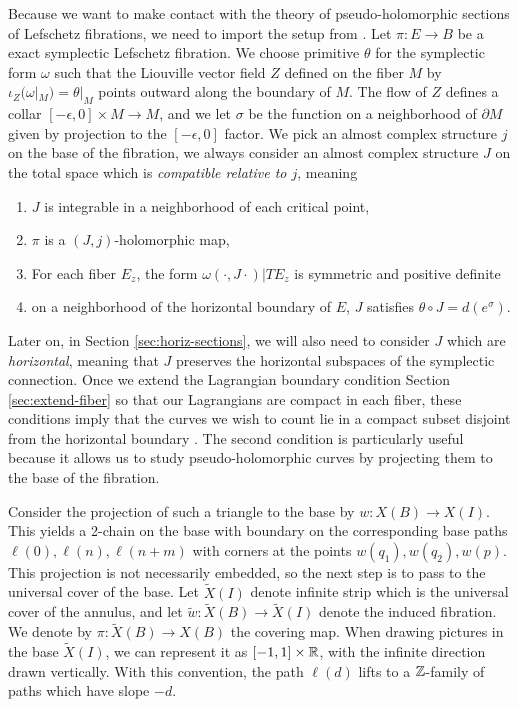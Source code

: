 \documentclass[12pt]{amsart}
\begin{document}
Because we want to make contact with the theory of pseudo-holomorphic sections of Lefschetz fibrations, we need to import the setup from \cite[\S 2.1]{seidel-les}. Let $\pi : E \to B$ be a exact symplectic Lefschetz fibration. We choose primitive $\theta$ for the symplectic form $\omega$ such that the Liouville vector field $Z$ defined on the fiber $M$ by $\iota_Z(\omega|_M) = \theta|_M$ points outward along the boundary of $M$. The flow of $Z$ defines a collar $[-\epsilon,0]\times M \to M$, and we let $\sigma$ be the function on a neighborhood of $\partial M$ given by projection to the $[-\epsilon,0]$ factor. We pick an almost complex structure $j$ on the base of the fibration, we always consider an almost complex structure $J$ on the total space which is \emph{compatible relative to $j$}, meaning
\begin{enumerate}
\item $J$ is integrable in a neighborhood of each critical point,
\item $\pi$ is a $(J,j)$-holomorphic map,
\item For each fiber $E_z$, the form $\omega(\cdot, J\cdot)|TE_z$ is symmetric and positive definite
\item on a neighborhood of the horizontal boundary of $E$, $J$ satisfies $\theta \circ J = d(e^\sigma)$.
\end{enumerate}
Later on, in Section \ref{sec:horiz-sections}, we will also need to consider $J$ which are \emph{horizontal}, meaning that $J$ preserves the horizontal subspaces of the symplectic connection. Once we extend the Lagrangian boundary condition Section \ref{sec:extend-fiber} so that our Lagrangians are compact in each fiber, these conditions imply that the curves we wish to count lie in a compact subset disjoint from the horizontal boundary \cite[Lemma 2.2]{seidel-les}. The second condition is particularly useful because it allows us to study pseudo-holomorphic curves by projecting them to the base of the fibration.

Consider the projection of such a triangle to the base by $w : X(B)\to
X(I)$. This yields a 2-chain on the base with boundary on the
corresponding base paths $\ell(0),\ell(n),\ell(n+m)$ with corners at
the points $w(q_1),w(q_2),w(p)$. This projection is not necessarily embedded, so the next step is to pass to the universal cover of the
base. Let $\tilde{X}(I)$ denote infinite strip which is the universal
cover of the annulus, and let $\tilde{w}: \tilde{X}(B) \to
\tilde{X}(I)$ denote the induced fibration. We denote by $\pi:
\tilde{X}(B) \to X(B)$ the covering map. When drawing pictures in the
base $\tilde{X}(I)$, we can represent it as $[-1,1] \times \mathbb{R}$, with
the infinite direction drawn vertically. With this convention, the
path $\ell(d)$ lifts to a $\mathbb{Z}$-family of paths which have slope $-d$.
\end{document}
